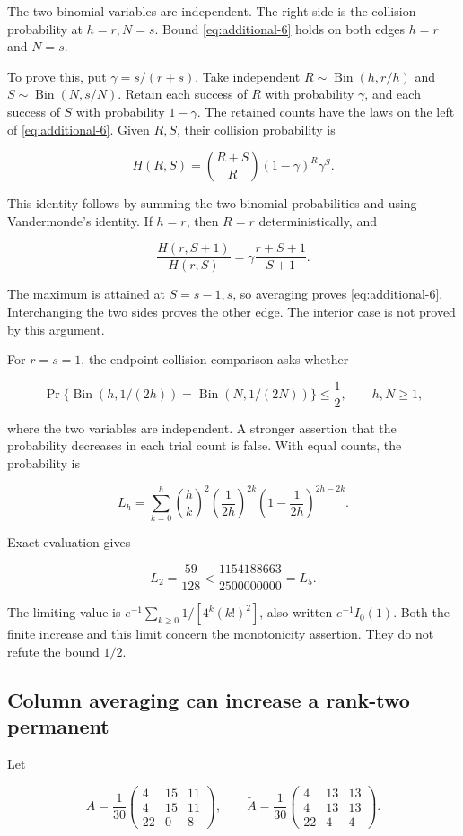 The two binomial variables are independent. The right side is the collision probability at \(h=r,N=s\). Bound \eqref{eq:additional-6} holds on both edges \(h=r\) and \(N=s\).

To prove this, put \(\gamma=s/(r+s)\). Take independent \(R\sim\operatorname{Bin}(h,r/h)\) and \(S\sim\operatorname{Bin}(N,s/N)\). Retain each success of \(R\) with probability \(\gamma\), and each success of \(S\) with probability \(1-\gamma\). The retained counts have the laws on the left of \eqref{eq:additional-6}. Given \(R,S\), their collision probability is

\[
H(R,S)=\binom{R+S}{R}(1-\gamma)^R\gamma^S.
\]

This identity follows by summing the two binomial probabilities and using Vandermonde's identity. If \(h=r\), then \(R=r\) deterministically, and

\[
\frac{H(r,S+1)}{H(r,S)}
=\gamma\frac{r+S+1}{S+1}.
\]

The maximum is attained at \(S=s-1,s\), so averaging proves \eqref{eq:additional-6}. Interchanging the two sides proves the other edge. The interior case is not proved by this argument.

For \(r=s=1\), the endpoint collision comparison asks whether

\[
\Pr\{\operatorname{Bin}(h,1/(2h))
=\operatorname{Bin}(N,1/(2N))\}\le\frac12,
\qquad h,N\ge1,
\]

where the two variables are independent. A stronger assertion that the probability decreases in each trial count is false. With equal counts, the probability is

\[
L_h=\sum_{k=0}^h\binom hk^2
\left(\frac1{2h}\right)^{2k}
\left(1-\frac1{2h}\right)^{2h-2k}.
\]

Exact evaluation gives

\[
L_2=\frac{59}{128}<\frac{1154188663}{2500000000}=L_5.
\]

The limiting value is \(e^{-1}\sum_{k\ge0}1/[4^k(k!)^2]\), also written \(e^{-1}I_0(1)\). Both the finite increase and this limit concern the monotonicity assertion. They do not refute the bound \(1/2\).

\subsection{Column averaging can increase a rank-two permanent}\label{app:additional-18}

Let

\[
A=\frac1{30}\begin{pmatrix}4&15&11\\4&15&11\\22&0&8\end{pmatrix},\qquad
\widetilde A=\frac1{30}\begin{pmatrix}4&13&13\\4&13&13\\22&4&4\end{pmatrix}.
\]

